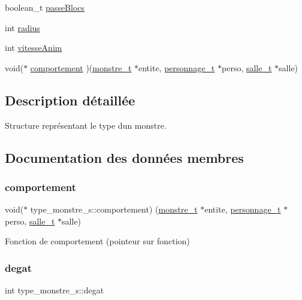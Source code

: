 \begin{DoxyCompactItemize}
boolean\+\_\+t \hyperlink{structtype__monstre__s_a0f60370f9ae95fff9ab024fbf6485df6}{passe\+Blocs}
\item 
int \hyperlink{structtype__monstre__s_ac1709851cb02ee762447582a20aedb54}{radius}
\item 
int \hyperlink{structtype__monstre__s_a125257fd616cb7a0a4c82ae30f7d849e}{vitesse\+Anim}
\item 
void($\ast$ \hyperlink{structtype__monstre__s_a2ca7834d71e7589f5fefcbf503d1351d}{comportement} )(\hyperlink{structmonstre__s}{monstre\+\_\+t} $\ast$entite, \hyperlink{structpersonnage__s}{personnage\+\_\+t} $\ast$perso, \hyperlink{structsalle__s}{salle\+\_\+t} $\ast$salle)
\end{DoxyCompactItemize}


\subsection{Description détaillée}
Structure représentant le type d\textquotesingle{}un monstre. 

\subsection{Documentation des données membres}
\mbox{\label{structtype__monstre__s_a2ca7834d71e7589f5fefcbf503d1351d}} 
\subsubsection{\texorpdfstring{comportement}{comportement}}
{\footnotesize\ttfamily void($\ast$ type\+\_\+monstre\+\_\+s\+::comportement) (\hyperlink{structmonstre__s}{monstre\+\_\+t} $\ast$entite, \hyperlink{structpersonnage__s}{personnage\+\_\+t} $\ast$perso, \hyperlink{structsalle__s}{salle\+\_\+t} $\ast$salle)}

Fonction de comportement (pointeur sur fonction) \mbox{\label{structtype__monstre__s_aa3e5568720dc977348e6929f3df5260c}} 
\subsubsection{\texorpdfstring{degat}{degat}}
{\footnotesize\ttfamily int type\+\_\+monstre\+\_\+s\+::degat}

